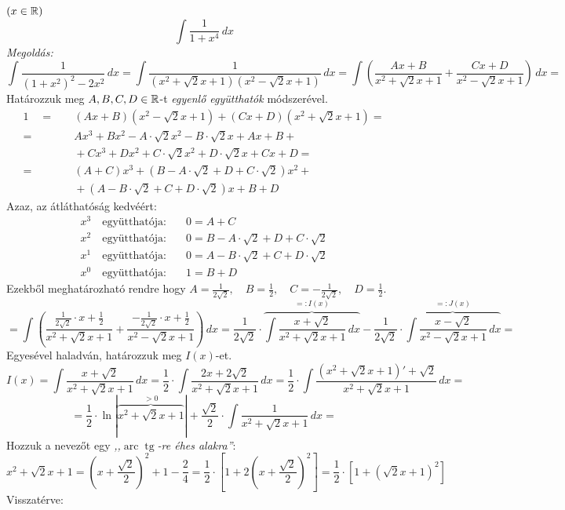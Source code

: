 \documentclass[a4paper,11.5pt]{article}
\DeclareMathOperator{\tg}{tg}
\DeclareMathOperator{\arc}{arc}
\begin{document}
	\begin{exercise}$(x\in\mathbb{R})$
		\[ \int\frac{1}{1+x^4}\,dx \]
		\textit{Megoldás:} 
		\[ \int\frac{1}{(1+x^2)^2-2x^2}\,dx=\int\frac{1}{(x^2+\sqrt{2}x+1)(x^2-\sqrt{2}x+1) }\,dx=\int\left(\frac{Ax+B}{x^2+\sqrt{2}x+1}+\frac{Cx+D}{x^2-\sqrt{2}x+1}\right)\,dx= \]
		Határozzuk meg $A,B,C,D\in\mathbb{R}$-t \textit{egyenlő együtthatók} módszerével.
		\begin{align*}
			1 \quad =&\quad (Ax+B)(x^2-\sqrt{2}x+1)+(Cx+D)(x^2+\sqrt{2}x+1)=\\
					=&\quad Ax^3+Bx^2-A\cdot\sqrt{2}x^2-B\cdot\sqrt{2}x+Ax+B+\\
					&\quad +Cx^3+Dx^2+C\cdot\sqrt{2}x^2+D\cdot\sqrt{2}x+Cx+D=\\ 
					=&\quad (A+C)x^3+(B-A\cdot\sqrt{2}+D+C\cdot\sqrt{2})x^2+\\
					&\quad +(A-B\cdot\sqrt{2}+C+D\cdot\sqrt{2})x+B+D
 		\end{align*}
 		Azaz, az átláthatóság kedvéért:
 		\begin{align*}
	 		x^3 \quad \text{együtthatója:}&\quad  0=A+C\\
	 		x^2 \quad \text{együtthatója:}&\quad  0=B-A\cdot\sqrt{2}+D+C\cdot\sqrt{2}\\
	 		x^1 \quad \text{együtthatója:}&\quad  0=A-B\cdot\sqrt{2}+C+D\cdot\sqrt{2}\\
	 		x^0 \quad \text{együtthatója:}&\quad  1=B+D
 		\end{align*}
 		Ezekből meghatározható rendre hogy $A=\frac{1}{2\sqrt{2}},\quad B=\frac{1}{2},\quad C=-\frac{1}{2\sqrt{2}},\quad D=\frac{1}{2}$.
 		\[=\int\left(\frac{\frac{1}{2\sqrt{2}}\cdot x+\frac{1}{2}}{x^2+\sqrt{2}x+1}+\frac{-\frac{1}{2\sqrt{2}}\cdot x+\frac{1}{2}}{x^2-\sqrt{2}x+1}\right)\,dx=\frac{1}{2\sqrt{2}}\cdot\overbrace{\int\frac{x+\sqrt{2}}{x^2+\sqrt{2}x+1}\,dx}^{=:I(x)}-\frac{1}{2\sqrt{2}}\cdot\overbrace{\int\frac{x-\sqrt{2}}{x^2-\sqrt{2}x+1}\,dx}^{=:J(x)}= \]
 		Egyesével haladván, határozzuk meg $I(x)$-et.
 		\[ I(x)=\int\frac{x+\sqrt{2}}{x^2+\sqrt{2}x+1}\,dx=\frac{1}{2}\cdot\int\frac{2x+2\sqrt{2}}{x^2+\sqrt{2}x+1}\,dx=\frac{1}{2}\cdot\int\frac{(x^2+\sqrt{2}x+1)'+\sqrt{2}}{x^2+\sqrt{2}x+1}\,dx=\]
 		\[=\frac{1}{2}\cdot\ln|\overbrace{x^2+\sqrt{2}x+1}^{>0}|+\frac{\sqrt{2}}{2}\cdot\int\frac{1}{x^2+\sqrt{2}x+1}\,dx= \]
 		Hozzuk a nevezőt egy \textit{,,$\arc\tg$-re éhes alakra''}:
 		\[ x^2+\sqrt{2}x+1=\left(x+\frac{\sqrt{2}}{2}\right)^2+1-\frac{2}{4}=\frac{1}{2}\cdot\left[1+2\left(x+\frac{\sqrt{2}}{2}\right)^2\right]=\frac{1}{2}\cdot\left[1+\left(\sqrt{2}x+1\right)^2\right] \]
 		Visszatérve:

\end{exercise}
\end{document}

